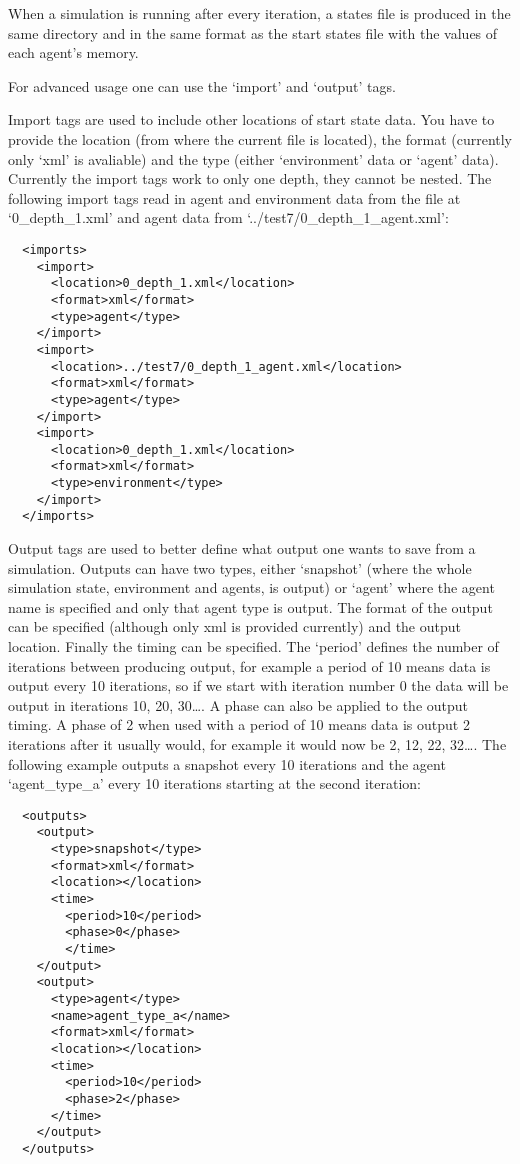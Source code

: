 When a simulation is running after every iteration, a states file is produced
in the same directory and in the same format as the start states file with the
values of each agent's memory.

For advanced usage one can use the `import' and `output' tags.

Import tags are used to include other locations of start state data. You have 
to provide the location (from where the current file is located), the format 
(currently only `xml' is avaliable) and the type (either `environment' data 
or `agent' data). Currently the import tags work to only one depth, they 
cannot be nested. The following import tags read in agent and environment data
from the file at `0\_depth\_1.xml' and agent data from
`../test7/0\_depth\_1\_agent.xml':

\clearpage

\begin{verbatim}
  <imports>
    <import>
      <location>0_depth_1.xml</location>
      <format>xml</format>
      <type>agent</type>
    </import>
    <import>
      <location>../test7/0_depth_1_agent.xml</location>
      <format>xml</format>
      <type>agent</type>
    </import>
    <import>
      <location>0_depth_1.xml</location>
      <format>xml</format>
      <type>environment</type>
    </import>
  </imports>
\end{verbatim}

Output tags are used to better define what output one wants to save from a 
simulation. Outputs can have two types, either `snapshot' (where the whole 
simulation state, environment and agents, is output) or `agent' where the 
agent name is specified and only that agent type is output. The format of the 
output can be specified (although only xml is provided currently) and the 
output location. Finally the timing can be specified. The `period' defines 
the number of iterations between producing output, for example a period of 10 
means data is output every 10 iterations, so if we start with iteration number 
0 the data will be output in iterations 10, 20, 30\ldots. A phase can also be
applied to the output timing. A phase of 2 when used with a period of 10 means
data is output 2 iterations after it usually would, for example it would now be
2, 12, 22, 32\ldots. The following example outputs a snapshot every 10
iterations and the agent `agent\_type\_a' every 10 iterations starting at the
second iteration:

\clearpage

\begin{verbatim}
  <outputs>
    <output>
      <type>snapshot</type>
      <format>xml</format>
      <location></location>
      <time>
        <period>10</period>
        <phase>0</phase>	
        </time>
    </output>
    <output>
      <type>agent</type>
      <name>agent_type_a</name>
      <format>xml</format>
      <location></location>
      <time>
        <period>10</period>
        <phase>2</phase>	
      </time>
    </output>
  </outputs>
\end{verbatim}
